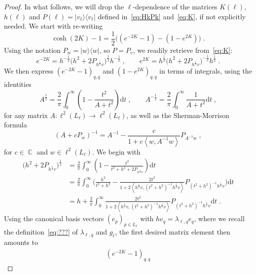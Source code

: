 \documentclass[12pt,a4paper]{article}
\numberwithin{equation}{section}
\newcommand{\1}{\mathbb{I}}
\DeclareMathOperator{\C}{\mathbb{C}}
\newcommand{\half}{\frac{1}{2}}
\newcommand{\eva}[1]{\left\langle #1 \right\rangle}
\theoremstyle{plain}
\theoremstyle{definition}
\theoremstyle{remark}
\theoremstyle{plain}
\theoremstyle{definition}
\theoremstyle{remark}
\begin{document}
\begin{proof}
In what follows, we will drop the $ \ell $-dependence of the matrices $ K(\ell) $, $ h(\ell) $ and $ P(\ell) = |v_\ell \rangle \langle v_\ell| $ defined in~\eqref{eq:HkPk} and~\eqref{eq:K}, if not explicitly needed. We start with re-writing
\begin{equation} \label{eq:coshrewriting}
	\cosh(2K)-1
	= \half\big((e^{-2K}-1)-(1-e^{2K})\big) \;.
\end{equation}
Using the notation $ P_w = |w \rangle \langle w| $, so $ P = P_v $, we readily retrieve from~\eqref{eq:K}:
\begin{equation}
	e^{-2K} = h^{-\half} \big(h^2 +2P_{h^{\half} v}\big)^{\half} h^{-\half} \;, \qquad
	e^{2K} = h^{\half} \big(h^2 +2P_{h^{\half} v}\big)^{-\half} h^{\half} \;.
\end{equation}
We then express $ (e^{-2K}-1)_{q,q} $ and $ (1-e^{2K})_{q,q} $ in terms of integrals, using the identities
\begin{equation}\label{eq:intid}
	A^\half = \frac{2}{\pi} \int_0^\infty \left(1- \frac{t^2}{A+t^2}\right)\mathrm{d}t\;,\qquad
	A^{-\half} = \frac{2}{\pi} \int_0^\infty \frac{1}{A+t^2} \mathrm{d}t \;,
\end{equation}
for any matrix $ A: \ell^2(L_\ell) \to \ell^2(L_\ell) $, as well as the Sherman-Morrison formula
\begin{equation}\label{eq:shermor}
	(A+cP_w)^{-1} = A^{-1} - \frac{c}{1+c\eva{w, A^{-1}w}}P_{A^{-1}w} \;,
\end{equation}
for $ c \in \C $ and $ w \in \ell^2(L_\ell) $. We begin with 
\begin{align}
	\big(h^2 +2P_{h^{\half} v}\big)^{\half} &= \frac{2}{\pi} \int_0^\infty \left(1- \frac{t^2}{t^2+h^2 +2P_{h^{\half} v}}\right)\mathrm{d}t\nonumber\\
	&= \frac{2}{\pi} \int_0^\infty \Bigg( \frac{h^2}{t^2+h^2} - \frac{2 t^2}{1+ 2\eva{h^{\half} v ,(t^2+h^2)^{-1} h^\half v}} P_{(t^2+h^2)^{-1}h^{\half} v} \Bigg) \mathrm{d}t \nonumber\\
	&= h + \frac{2}{\pi} \int_0^\infty  \frac{2t^2}{1+ 2\eva{h^{\half} v ,(t^2+h^2)^{-1} h^\half v}}  P_{(t^2+h^2)^{-1}h^{\half} v}\mathrm{d}t \;. \label{eq:e-2k}
\end{align}
Using the canonical basis vectors $ (e_p)_{p \in L_\ell} $ with $ h e_q = \lambda_{\ell,q} e_q $, where we recall the definition~\eqref{eq:???} of $ \lambda_{\ell,q} $ and $ g_\ell $, the first desired matrix element then amounts to
\begin{align}
	(e^{-2K}-1)_{q,q}

\end{align}
\end{proof}
\end{document}

